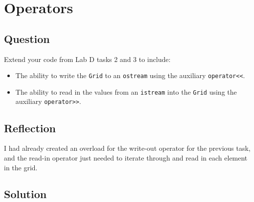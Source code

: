 \section{Operators}

    \subsection*{Question}
        Extend your code from Lab D tasks 2 and 3 to include:
        \begin{itemize}
            \item The ability to write the \texttt{Grid} to an \texttt{ostream} using the auxiliary \texttt{operator<<}.
            \item The ability to read in the values from an \texttt{istream} into the \texttt{Grid} using the auxiliary \texttt{operator>>}.
        \end{itemize}
    
    \subsection*{Reflection}
        I had already created an overload for the write-out operator for the previous task,
        and the read-in operator just needed to iterate through and read in each element in the grid.


    \subsection*{Solution}
        \begin{listing}[H]
            \inputminted[firstline=62]{cpp}{../Tasks/01-Operators/Grid.cpp}
        \end{listing}